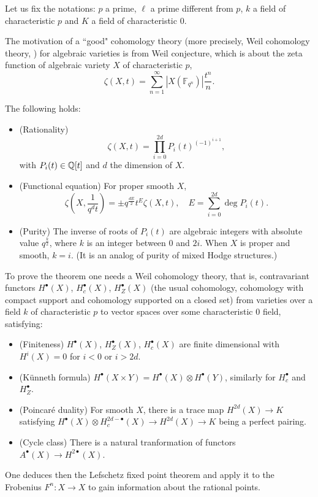 Let us fix the notations: $p$ a prime, $\ell$ a prime different from $p$, 
$k$ a field of characteristic $p$ and $K$ a field of characteristic $0$.

The motivation of a ``good" cohomology theory 
(more precisely, Weil cohomology theory, \cite{Sta}) 
for algebraic varieties is from Weil conjecture, 
which is about the zeta function of algebraic variety $X$ of characteristic $p$,
\[
    \zeta(X, t)=\sum_{n = 1} ^ {\infty} |X(\mathbb{F} _ {q^n})| \frac {t^n} {n}.
\]
\begin{theorem}
    The following holds:
    \begin{itemize}
        \item (Rationality) 
            \[
                \zeta(X, t) = \prod_ {i = 0} ^ {2d} P_i(t) ^ {(-1) ^ {i + 1}},
            \]
            with $P_i(t)\in {\mathbb {Q}}[t]$ and $d$ the dimension of $X$.
        \item (Functional equation) 
            For proper smooth $X$, 
            \[
                \zeta(X, \frac {1} {q^d t})=\pm q^{\frac {dE} {2}} t^E \zeta(X, t), 
                \quad E = \sum_{i = 0}^{2d} \deg P_i(t).
            \]
        \item (Purity) 
            The inverse of roots of $P_i(t)$ are algebraic integers 
            with absolute value $q^{\frac{k}{2}}$, 
            where $k$ is an integer between $0$ and $2i$. 
            When $X$ is proper and smooth, $k=i$. 
            (It is an analog of purity of mixed Hodge structures.)
    \end{itemize}
\end{theorem}
To prove the theorem one needs a Weil cohomology theory, 
that is, contravariant functors $H^\bullet(X)$, $H^\bullet_c(X)$, $H^\bullet_Z(X)$ 
(the usual cohomology, cohomology with compact support and cohomology supported on a closed set) 
from varieties over a field $k$ of characteristic $p$ 
to vector spaces over some characteristic $0$ field, satisfying:
\begin{itemize}
    \item (Finiteness) 
        $H^\bullet (X)$, $H^\bullet_Z(X)$, $H^\bullet_c(X)$ are finite dimensional 
        with $H^i(X) = 0$ for $i < 0$ or $i > 2d$.
    \item (K\"unneth formula) 
        $H^\bullet (X\times Y) = H^\bullet (X) \otimes H^\bullet (Y)$, 
        similarly for $H^\bullet_c$ and $H^\bullet_Z$. 
    \item (Poincar\'e duality) 
        For smooth $X$, there is a trace map $H^{2d}(X) \to K$ satisfying 
        $H^\bullet(X) \otimes H^{2d-\bullet}_c(X) \to H^{2d}(X) \to K$ being a perfect pairing.
    \item (Cycle class) 
        There is a natural tranformation of functors $A^\bullet(X) \to H^{2 \bullet}(X)$.
\end{itemize}
One deduces then the Lefschetz fixed point theorem 
and apply it to the Frobenius $F^n \colon X \to X$ 
to gain information about the rational points.

